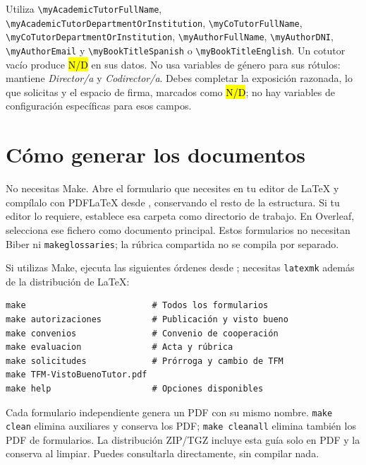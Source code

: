 \documentclass[10pt,a4paper]{article}
\newcommand{\variable}[1]{\texttt{\textbackslash{}}\nolinkurl{#1}}
\newcommand{\fichero}[1]{\path{#1}}
\begin{document}
Utiliza \variable{myAcademicTutorFullName}, \variable{myAcademicTutorDepartmentOrInstitution}, \variable{myCoTutorFullName}, \variable{myCoTutorDepartmentOrInstitution}, \variable{myAuthorFullName}, \variable{myAuthorDNI}, \variable{myAuthorEmail} y \variable{myBookTitleSpanish} o \variable{myBookTitleEnglish}. Un cotutor vacío produce \hl{N/D} en sus datos. No usa variables de género para sus rótulos: mantiene \emph{Director/a} y \emph{Codirector/a}. Debes completar la exposición razonada, lo que solicitas y el espacio de firma, marcados como \hl{N/D}; no hay variables de configuración específicas para esos campos.

\medskip
\begin{minipage}{\linewidth}
\setlength{\parskip}{4pt}
\section{Cómo generar los documentos}

No necesitas Make. Abre el formulario que necesites en tu editor de LaTeX y compílalo con PDFLaTeX desde \fichero{PapeleoTFM/}, conservando el resto de la estructura. Si tu editor lo requiere, establece esa carpeta como directorio de trabajo. En Overleaf, selecciona ese fichero como documento principal. Estos formularios no necesitan Biber ni \texttt{makeglossaries}; la rúbrica compartida no se compila por separado.

Si utilizas Make, ejecuta las siguientes órdenes desde \fichero{PapeleoTFM/}; necesitas \texttt{latexmk} además de la distribución de LaTeX:

\medskip
\begin{minipage}{\linewidth}
\begin{verbatim}
make                         # Todos los formularios
make autorizaciones          # Publicación y visto bueno
make convenios               # Convenio de cooperación
make evaluacion              # Acta y rúbrica
make solicitudes             # Prórroga y cambio de TFM
make TFM-VistoBuenoTutor.pdf
make help                    # Opciones disponibles
\end{verbatim}
\end{minipage}
Cada formulario independiente genera un PDF con su mismo nombre. \texttt{make clean} elimina auxiliares y conserva los PDF; \texttt{make cleanall} elimina también los PDF de formularios. La distribución ZIP/TGZ incluye esta guía solo en PDF y la conserva al limpiar. Puedes consultarla directamente, sin compilar nada.


\end{minipage}
\end{document}
